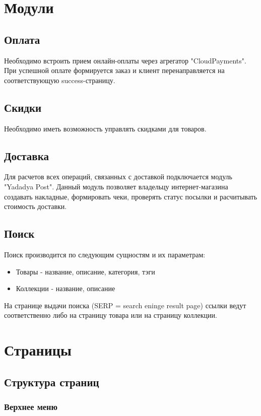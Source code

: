 \documentclass[DIV=calc, paper=a4, fontsize=11pt]{scrartcl} %
\begin{document}
\section{Модули}

\subsection{Оплата}
Необходимо встроить прием онлайн-оплаты через агрегатор "CloudPayments". При успешной оплате формируется заказ и клиент перенаправляется на соответствующую success-страницу.

\subsection{Скидки}
Необходимо иметь возможность управлять скидками для товаров.

\subsection{Доставка}\label{subsec:delivery}
Для расчетов всех операций, связанных с доставкой подключается модуль "Yadadya Post". Данный модуль позволяет владельцу интернет-магазина создавать накладные, формировать чеки, проверять статус посылки и расчитывать стоимость доставки.

\subsection{Поиск}
Поиск производится по следующим сущностям и их параметрам:
\begin{itemize}
	\item Товары - название, описание, категория, тэги
	\item Коллекции - название, описание 
\end{itemize}
На странице выдачи поиска (SERP = search eninge result page) ссылки ведут соответственно либо на страницу товара или на страницу коллекции.

\section{Страницы}

\subsection{Структура страниц}

\subsubsection{Верхнее меню}
\end{document}

